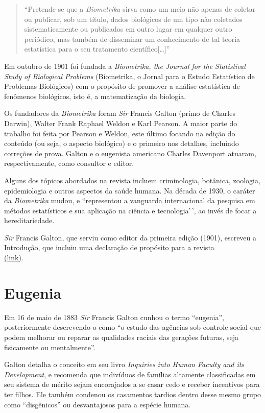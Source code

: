 \documentclass[
]{book}
\theoremstyle{definition}
\theoremstyle{definition}
\theoremstyle{definition}
\theoremstyle{definition}
\theoremstyle{remark}
\begin{document}
\begin{quote}
``Pretende-se que a \textit{Biometrika} sirva como um meio não apenas de coletar ou publicar, sob um título, dados biológicos de um tipo não coletados sistematicamente ou publicados em outro lugar em qualquer outro periódico, mas também de disseminar um conhecimento de tal teoria estatística para o seu tratamento científico{[}\ldots{]}''
\end{quote}

Em outubro de 1901 foi fundada a \emph{Biometrika, the Journal for the Statistical Study of Biological Problems} (Biometrika, o Jornal para o Estudo Estatístico de Problemas Biológicos) com o propósito de promover a análise estatística de fenômenos biológicos, isto é, a matematização da biologia.

Os fundadores da \emph{Biometrika} foram \emph{Sir} Francis Galton (primo de Charles Darwin), Walter Frank Raphael Weldon e Karl Pearson. A maior parte do trabalho foi feita por Pearson e Weldon, este último focando na edição do conteúdo (ou seja, o aspecto biológico) e o primeiro nos detalhes, incluindo correções de prova. Galton e o eugenista americano Charles Davenport atuaram, respectivamente, como consultor e editor.

Alguns dos tópicos abordados na revista incluem criminologia, botânica, zoologia, epidemiologia e outros aspectos da saúde humana. Na década de 1930, o caráter da \emph{Biometrika} mudou, e ``representou a vanguarda internacional da pesquisa em métodos estatísticos e sua aplicação na ciência e tecnologia'\,', ao invés de focar a hereditariedade.

\emph{Sir} Francis Galton, que serviu como editor da primeira edição (1901), escreveu a Introdução, que incluiu uma declaração de propósito para a revista\\
\href{https://academic.oup.com/biomet/article-abstract/1/1/1/192192?redirectedFrom=fulltext}{(link)}.

\hypertarget{eugenia}{%
\section{Eugenia}\label{eugenia}}

Em 16 de maio de 1883 \emph{Sir} Francis Galton cunhou o termo ``eugenia'', posteriormente descrevendo-o como ``o estudo das agências sob controle social que podem melhorar ou reparar as qualidades raciais das gerações futuras, seja fisicamente ou mentalmente''.

Galton detalha o conceito em seu livro \emph{Inquiries into Human Faculty and its Development}, e recomenda que indivíduos de famílias altamente classificadas em seu sistema de mérito sejam encorajados a se casar cedo e receber incentivos para ter filhos. Ele também condenou os casamentos tardios dentro desse mesmo grupo como ``disgênicos'' ou desvantajosos para a espécie humana.
\end{document}
